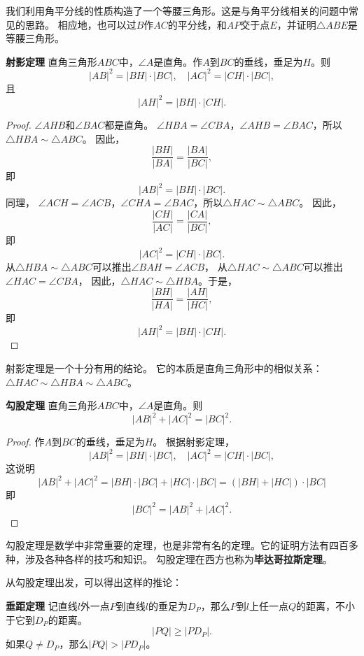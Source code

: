 \documentclass[12pt,UTF8,fontset=none]{ctexbook}
\begin{document}
我们利用角平分线的性质构造了一个等腰三角形。这是与角平分线相关的问题中常见的思路。
相应地，也可以过$B$作$AC$的平分线，和$AP$交于点$E$，并证明$\triangle ABE$是等腰三角形。

\begin{tm}{\textbf{射影定理}}\label{tm:0-2-2}
    直角三角形$ABC$中，$\angle A$是直角。作$A$到$BC$的垂线，垂足为$H$。则
    $$ |AB|^2 = |BH|\cdot |BC|, \quad |AC|^2 = |CH|\cdot |BC|,$$
    且
    $$|AH|^2 = |BH| \cdot |CH|.$$
\end{tm}
\begin{proof}
    $\angle AHB$和$\angle BAC$都是直角。
    $\angle HBA = \angle CBA$，$\angle AHB = \angle BAC$，所以$\triangle HBA \sim \triangle ABC$。
    因此，
    $$ \frac{|BH|}{|BA|} = \frac{|BA|}{|BC|},$$
    即
    $$ |AB|^2 = |BH|\cdot |BC|.$$
    同理，
    $\angle ACH = \angle ACB$，$\angle CHA = \angle BAC$，所以$\triangle HAC \sim \triangle ABC$。
    因此，
    $$ \frac{|CH|}{|AC|} = \frac{|CA|}{|BC|},$$
    即
    $$ |AC|^2 = |CH|\cdot |BC|.$$
    从$\triangle HBA \sim \triangle ABC$可以推出$\angle BAH = \angle ACB$，
    从$\triangle HAC \sim \triangle ABC$可以推出$\angle HAC = \angle CBA$，
    因此，$\triangle HAC \sim \triangle HBA$。于是，
    $$ \frac{|BH|}{|HA|} = \frac{|AH|}{|HC|},$$
    即
    $$|AH|^2 = |BH| \cdot |CH|.$$
\end{proof}

射影定理是一个十分有用的结论。
它的本质是直角三角形中的相似关系：$\triangle HAC \sim \triangle HBA \sim \triangle ABC$。

\begin{tm}{\textbf{勾股定理}}\label{tm:0-2-3}
    直角三角形$ABC$中，$\angle A$是直角。则
    $$|AB|^2+|AC|^2 = |BC|^2.$$
\end{tm}
\begin{proof}
    作$A$到$BC$的垂线，垂足为$H$。
    根据射影定理，    
    $$ |AB|^2 = |BH|\cdot |BC|, \quad |AC|^2 = |CH|\cdot |BC|,$$
    这说明
    $$ |AB|^2+|AC|^2 = |BH|\cdot |BC| + |HC|\cdot |BC| = (|BH| + |HC|)\cdot |BC|$$
    即
    $$ |BC|^2 = |AB|^2+|AC|^2.$$
\end{proof}

勾股定理是数学中非常重要的定理，也是非常有名的定理。它的证明方法有四百多种，涉及各种各样的技巧和知识。
勾股定理在西方也称为\textbf{毕达哥拉斯定理}。

从勾股定理出发，可以得出这样的推论：
\begin{cor}{\textbf{垂距定理}}\label{cr:0-2-0}
    记直线$l$外一点$P$到直线$l$的垂足为$D_P$，那么$P$到$l$上任一点$Q$的距离，不小于它到$D_P$的距离。
    $$ |PQ | \geqslant |PD_P|.$$
    如果$Q \neq D_P$，那么$|PQ| > |PD_P|$。
\end{cor}
\end{document}
